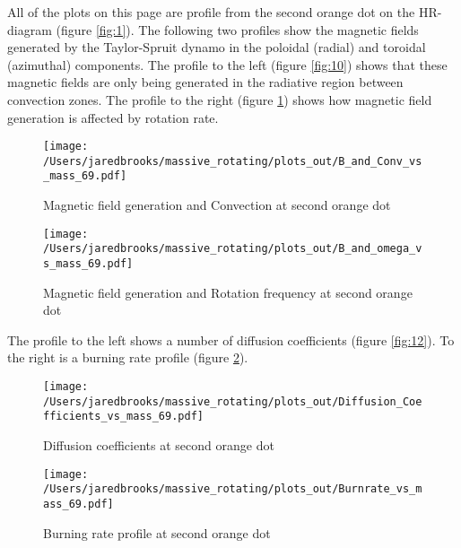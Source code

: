 \documentclass{article}
\begin{document}
        \pagebreak

        All of the plots on this page are profile from the second orange dot on the HR-diagram (figure \ref{fig:1}).  The following two profiles show the magnetic fields generated by the Taylor-Spruit dynamo in the poloidal (radial) and toroidal (azimuthal) components.  The profile to the left (figure \ref{fig:10}) shows that these magnetic fields are only being generated in the radiative region between convection zones.  The profile to the right (figure \ref{fig:11}) shows how magnetic field generation is affected by rotation rate.

        \begin{figure}[H]
          \begin{minipage}[b]{0.5\linewidth}
            \centering
            \texttt{[image: /Users/jaredbrooks/massive\_rotating/plots\_out/B\_and\_Conv\_vs\_mass\_69.pdf]}
            \caption{Magnetic field generation and Convection at second orange dot}
            \label{fig:10}
          \end{minipage}
          \hspace{0cm}
          \begin{minipage}[b]{0.5\linewidth}
            \centering
            \texttt{[image: /Users/jaredbrooks/massive\_rotating/plots\_out/B\_and\_omega\_vs\_mass\_69.pdf]}
            \caption{Magnetic field generation and Rotation frequency at second orange dot}
            \label{fig:11}
          \end{minipage}
        \end{figure}
        
        The profile to the left shows a number of diffusion coefficients (figure \ref{fig:12}).  To the right is a burning rate profile (figure \ref{fig:13}).
        
        \begin{figure}[H]
          \begin{minipage}[b]{0.5\linewidth}
            \centering
            \texttt{[image: /Users/jaredbrooks/massive\_rotating/plots\_out/Diffusion\_Coefficients\_vs\_mass\_69.pdf]}
            \caption{Diffusion coefficients at second orange dot}
            \label{fig:12}
          \end{minipage}
          \hspace{0cm}
          \begin{minipage}[b]{0.5\linewidth}
            \centering
            \texttt{[image: /Users/jaredbrooks/massive\_rotating/plots\_out/Burnrate\_vs\_mass\_69.pdf]}
            \caption{Burning rate profile at second orange dot}
            \label{fig:13}
          \end{minipage}
        \end{figure}
\end{document}
